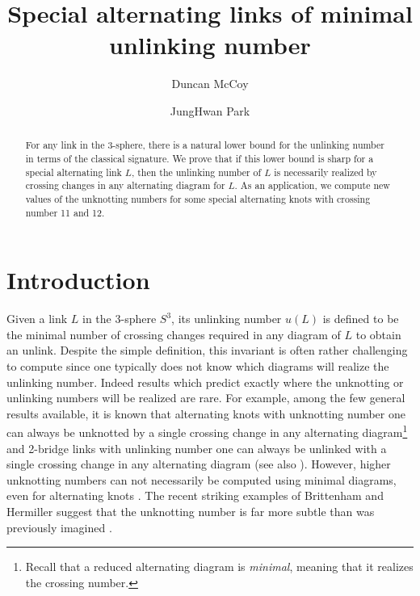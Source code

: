 \documentclass[a4paper,11pt]{amsart}
\theoremstyle{definition}
\theoremstyle{remark}
\numberwithin{equation}{section}
\begin{document}
\title{Special alternating links of minimal unlinking number}%


\author{Duncan McCoy}%
\address {Université du Québec à Montréal}

\author{JungHwan Park}%
\address {Korea Advanced Institute of Science and Technology}


\begin{abstract}
For any link in the 3-sphere, there is a natural lower bound for the unlinking number in terms of the classical signature. We prove that if this lower bound is sharp for a special alternating link $L$, then the unlinking number of $L$ is necessarily realized by crossing changes in any alternating diagram for $L$. As an application, we compute new values of the unknotting numbers for some special alternating knots with crossing number 11 and 12.
\end{abstract}
\maketitle


\section{Introduction}
Given a link $L$ in the 3-sphere $S^3$, its unlinking number $u(L)$ is defined to be the minimal number of crossing changes required in any diagram of $L$ to obtain an unlink. Despite the simple definition, this invariant is often rather challenging to compute since one typically does not know which diagrams will realize the unlinking number. Indeed results which predict exactly where the unknotting or unlinking numbers will be realized are rare. For example, among the few general results available, it is known that alternating knots with unknotting number one can always be unknotted by a single crossing change in any alternating diagram\footnote{Recall that a reduced alternating diagram is \emph{minimal}, meaning that it realizes the crossing number.} \cite{McCoy2017alternating} and 2-bridge links with unlinking number one can always be unlinked with a single crossing change in any alternating diagram \cite{Kohn1991unlinking_2bridge} (see also \cite{Kanenobu-Murakami:1986, Gordon-Luecke:2006, Greene:2014}). However, higher unknotting numbers can not necessarily be computed using minimal diagrams, even for alternating knots \cite{Bleiler1984note, Bernhard1994unknotting, Brittenham2021BJ}. The recent striking examples of Brittenham and Hermiller suggest that the unknotting number is far more subtle than was previously imagined  \cite{Brittenham2025, Brittenham2026}.
\end{document}
